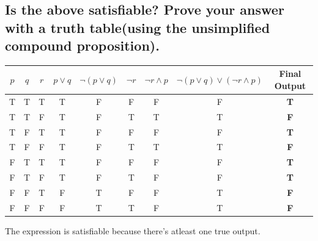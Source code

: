 \documentclass{article}
\begin{document}
    \subsection{Is the above satisfiable? Prove your answer with a truth table(using the unsimplified compound proposition).} 
        \begin{center}
            \begin{tabular}{|c|c|c|c|c|c|c|c|c|}
                \hline
                $p$ & $q$ & $r$ & $p \lor q$ & $\neg (p \lor q)$ & $\neg r$ & $\neg r \land p$ & $\neg (p \lor q) \lor (\neg r \land p)$ & \textbf{Final Output} \\
                \hline
                T & T & T & T & F & F & F & F & \textbf{T} \\
                T & T & F & T & F & T & T & T & \textbf{F} \\
                T & F & T & T & F & F & F & F & \textbf{T} \\
                T & F & F & T & F & T & T & T & \textbf{F} \\
                F & T & T & T & F & F & F & F & \textbf{T} \\
                F & T & F & T & F & T & F & F & \textbf{T} \\
                F & F & T & F & T & F & F & T & \textbf{F} \\
                F & F & F & F & T & T & F & T & \textbf{F} \\
                \hline
            \end{tabular}
        \end{center}
    The expression is satisfiable because there's atleast one true output. 
\end{document}
